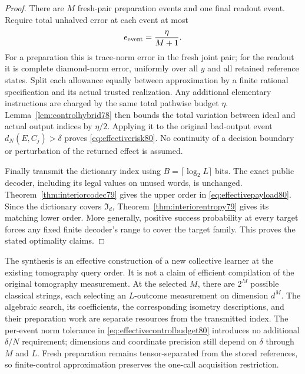 \begin{proof}
There are $M$ fresh-pair preparation events and one final readout
event.  Require total unhalved error at each event at most
\begin{equation}\label{eq:effectivecontrolbudget80}
 e_{\rm event}=\frac{\eta}{M+1}.
\end{equation}
For a preparation this is trace-norm error in the fresh joint pair;
for the readout it is complete diamond-norm error, uniformly over
all $y$ and all retained reference states.  Split each allowance
equally between approximation by a finite rational specification
and its actual trusted realization.  Any additional elementary
instructions are charged by the same total pathwise budget $\eta$.
Lemma~\ref{lem:controlhybrid78} then bounds the total variation
between ideal and actual output indices by $\eta/2$.
Applying it to the original bad-output event $d_N(E,C_j)>\delta$
proves \eqref{eq:effectiverisk80}.  No continuity of a decision
boundary or perturbation of the returned effect is assumed.

Finally transmit the dictionary index using
$B=\lceil\log_2L\rceil$ bits.  The exact public decoder, including
its legal values on unused words, is unchanged.
Theorem~\ref{thm:interiorcodec79} gives the upper order in
\eqref{eq:effectivepayload80}.  Since the dictionary covers
$\mathfrak I_d$, Theorem~\ref{thm:interiorentropy79} gives its
matching lower order.  More generally, positive success probability
at every target forces any fixed finite decoder's range to cover
the target family.  This proves the stated optimality claims.
\end{proof}

The synthesis is an effective construction of a new collective
learner at the existing tomography query order.  It is not a claim
of efficient compilation of the original tomography measurement.
At the selected $M$, there are $2^M$ possible classical strings,
each selecting an $L$-outcome measurement on dimension $d^M$.
The algebraic search, its coefficients, the corresponding isometry
descriptions, and their preparation work are separate resources
from the transmitted index.  The per-event norm tolerance in
\eqref{eq:effectivecontrolbudget80} introduces no additional
$\delta/N$ requirement; dimensions and coordinate precision still
depend on $\delta$ through $M$ and $L$.  Fresh preparation remains
tensor-separated from the stored references, so finite-control
approximation preserves the one-call acquisition restriction.
